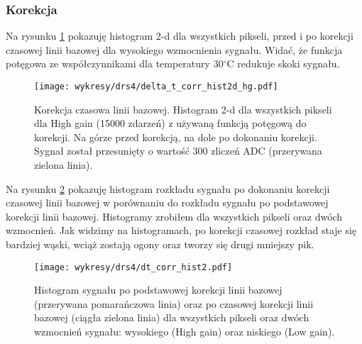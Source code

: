 \documentclass[a4paper,11pt,twoside]{article}
\begin{document}
\subsubsection{Korekcja}
Na rysunku \ref{fig:dt_corr_hist2d_all} pokazuję histogram 2-d dla wszystkich pikseli, przed i po korekcji czasowej linii bazowej dla wysokiego wzmocnienia sygnału. Widać, że funkcja potęgowa ze współczynnikami dla temperatury 30$^{\circ}$C redukuje skoki sygnału.

\begin{figure}[H] 
\centering
\texttt{[image: wykresy/drs4/delta\_t\_corr\_hist2d\_hg.pdf]}
\caption{Korekcja czasowa linii bazowej. Histogram 2-d dla wszystkich pikseli dla High gain (15000 zdarzeń) z używaną funkcją potęgową do korekcji. Na górze przed korekcją, na dole po dokonaniu korekcji. Sygnał został przesunięty o wartość 300 zliczeń ADC (przerywana zielona linia). }
\label{fig:dt_corr_hist2d_all}
\end{figure}


Na rysunku \ref{fig:dt_corr_hist} pokazuję histogram rozkładu sygnału po dokonaniu korekcji czasowej linii bazowej w porównaniu do rozkładu sygnału po podstawowej korekcji linii bazowej. Histogramy zrobiłem dla wszystkich pikseli oraz dwóch wzmocnień. Jak widzimy na histogramach, po korekcji czasowej rozkład staje się bardziej wąski, wciąż zostają ogony oraz tworzy się drugi mniejszy pik. 
\begin{figure}[H] 
\centering
\texttt{[image: wykresy/drs4/dt\_corr\_hist2.pdf]}
\caption{Histogram sygnału po podstawowej korekcji linii bazowej (przerywana pomarańczowa linia) oraz po czasowej korekcji linii bazowej (ciągła zielona linia) dla wszystkich pikseli oraz dwóch wzmocnień sygnału: wysokiego (High gain) oraz niskiego (Low gain). }
\label{fig:dt_corr_hist}
\end{figure}
\newpage
\end{document}
